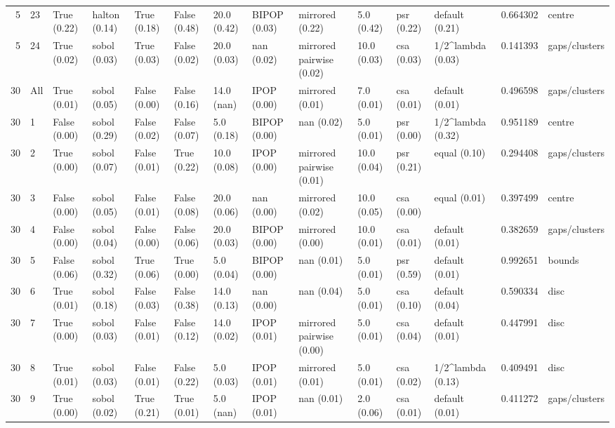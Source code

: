\begin{tabular}{rlllllllllllrl}
5 & 23 & True (0.22) & halton (0.14) & True (0.18) & False (0.48) & 20.0 (0.42) & BIPOP (0.03) & mirrored (0.22) & 5.0 (0.42) & psr (0.22) & default (0.21) & 0.664302 & centre \\
5 & 24 & True (0.02) & sobol (0.03) & True (0.03) & False (0.02) & 20.0 (0.03) & nan (0.02) & mirrored pairwise (0.02) & 10.0 (0.03) & csa (0.03) & 1/2^lambda (0.03) & 0.141393 & gaps/clusters \\
30 & All & True (0.01) & sobol (0.05) & False (0.00) & False (0.16) & 14.0 (nan) & IPOP (0.00) & mirrored (0.01) & 7.0 (0.01) & csa (0.01) & default (0.01) & 0.496598 & gaps/clusters \\
30 & 1 & False (0.00) & sobol (0.29) & False (0.02) & False (0.07) & 5.0 (0.18) & BIPOP (0.00) & nan (0.02) & 5.0 (0.01) & psr (0.00) & 1/2^lambda (0.32) & 0.951189 & centre \\
30 & 2 & True (0.00) & sobol (0.07) & False (0.01) & True (0.22) & 10.0 (0.08) & IPOP (0.00) & mirrored pairwise (0.01) & 10.0 (0.04) & psr (0.21) & equal (0.10) & 0.294408 & gaps/clusters \\
30 & 3 & False (0.00) & sobol (0.05) & False (0.01) & False (0.08) & 20.0 (0.06) & nan (0.00) & mirrored (0.02) & 10.0 (0.05) & csa (0.00) & equal (0.01) & 0.397499 & centre \\
30 & 4 & False (0.00) & sobol (0.04) & False (0.00) & False (0.06) & 20.0 (0.03) & BIPOP (0.00) & mirrored (0.00) & 10.0 (0.01) & csa (0.01) & default (0.01) & 0.382659 & gaps/clusters \\
30 & 5 & False (0.06) & sobol (0.32) & True (0.06) & True (0.00) & 5.0 (0.04) & BIPOP (0.00) & nan (0.01) & 5.0 (0.01) & psr (0.59) & default (0.01) & 0.992651 & bounds \\
30 & 6 & True (0.01) & sobol (0.18) & False (0.03) & False (0.38) & 14.0 (0.13) & nan (0.00) & nan (0.04) & 5.0 (0.01) & csa (0.10) & default (0.04) & 0.590334 & disc \\
30 & 7 & True (0.00) & sobol (0.03) & False (0.01) & False (0.12) & 14.0 (0.02) & IPOP (0.01) & mirrored pairwise (0.00) & 5.0 (0.01) & csa (0.04) & default (0.01) & 0.447991 & disc \\
30 & 8 & True (0.01) & sobol (0.03) & False (0.01) & False (0.22) & 5.0 (0.03) & IPOP (0.01) & mirrored (0.01) & 5.0 (0.01) & csa (0.02) & 1/2^lambda (0.13) & 0.409491 & disc \\
30 & 9 & True (0.00) & sobol (0.02) & True (0.21) & True (0.01) & 5.0 (nan) & IPOP (0.01) & nan (0.01) & 2.0 (0.06) & csa (0.01) & default (0.01) & 0.411272 & gaps/clusters \\

\end{tabular}
